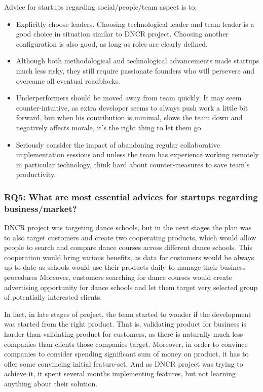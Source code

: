 \documentclass{article}
\begin{document}
Advice for startups regarding social/people/team aspect is to:
\begin{itemize}
\item Explicitly choose leaders. Choosing technological leader and team leader is a good choice in situation similar to DNCR project. Choosing another configuration is also good, as long as roles are clearly defined.
\item Although both methodological and technological advancements made startups much less risky, they still require passionate founders who will persevere and overcame all eventual roadblocks.
\item Underperformers should be moved away from team quickly. It may seem counter-intuitive, as extra developer seems to always push work a little bit forward, but when his contribution is minimal, slows the team down and negatively affects morale, it's the right thing to let them go.
\item Seriously consider the impact of abandoning regular collaborative implementation sessions and unless the team has experience working remotely in particular technology, think hard about counter-measures to save team's productivity.
\end{itemize}

\subsubsection{RQ5: What are most essential advices for startups regarding business/market?}
DNCR project was targeting dance schools, but in the next stages the plan was to also target customers and create two cooperating products, which would allow people to search and compare dance courses across different dance schools. This cooperation would bring various benefits, as data for customers would be always up-to-date as schools would use their products daily to manage their business procedures Moreover, customers searching for dance courses would create advertising opportunity for dance schools and let them target very selected group of potentially interested clients.

In fact, in late stages of project, the team started to wonder if the development was started from the right product. That is, validating product for business is harder than validating product for customers, as there is naturally much less companies than clients those companies target. Moreover, in order to convince companies to consider spending significant sum of money on product, it has to offer some convincing initial feature-set. And as DNCR project was trying to achieve it, it spent several months implementing features, but not learning anything about their solution.
\end{document}
